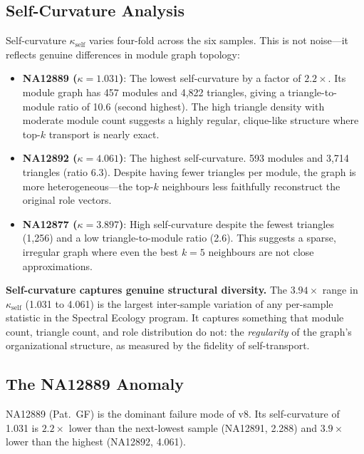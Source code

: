 \documentclass{../yalumba}
\begin{document}
\subsection{Self-Curvature Analysis}

Self-curvature $\kappa_{\text{self}}$ varies four-fold across the six
samples.  This is not noise---it reflects genuine differences in module
graph topology:

\begin{itemize}
  \item \textbf{NA12889 ($\kappa = 1.031$)}: The lowest self-curvature
    by a factor of $2.2\times$.  Its module graph has 457 modules and
    4{,}822 triangles, giving a triangle-to-module ratio of 10.6 (second
    highest).  The high triangle density with moderate module count suggests
    a highly regular, clique-like structure where top-$k$ transport is
    nearly exact.
  \item \textbf{NA12892 ($\kappa = 4.061$)}: The highest self-curvature.
    593 modules and 3{,}714 triangles (ratio 6.3).  Despite having fewer
    triangles per module, the graph is more heterogeneous---the top-$k$
    neighbours less faithfully reconstruct the original role vectors.
  \item \textbf{NA12877 ($\kappa = 3.897$)}: High self-curvature despite
    the fewest triangles (1{,}256) and a low triangle-to-module ratio
    (2.6).  This suggests a sparse, irregular graph where even the best
    $k = 5$ neighbours are not close approximations.
\end{itemize}

\begin{keyfinding}
\textbf{Self-curvature captures genuine structural diversity.}  The
$3.94\times$ range in $\kappa_{\text{self}}$ (1.031 to 4.061) is the
largest inter-sample variation of any per-sample statistic in the Spectral
Ecology program.  It captures something that module count, triangle count,
and role distribution do not: the \emph{regularity} of the graph's
organizational structure, as measured by the fidelity of self-transport.
\end{keyfinding}

\subsection{The NA12889 Anomaly}
\label{sec:anomaly}

NA12889 (Pat.~GF) is the dominant failure mode of v8.  Its self-curvature
of 1.031 is $2.2\times$ lower than the next-lowest sample (NA12891, 2.288)
and $3.9\times$ lower than the highest (NA12892, 4.061).
\end{document}
